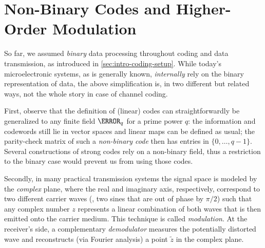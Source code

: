 \section{Non-Binary Codes and Higher-Order Modulation}\label{sec:intro-nonbinary}

So far, we assumed \emph{binary} data processing throughout coding and data transmission, as introduced in \cref{sec:intro-coding-setup}. While today's microelectronic systems, as is generally known, \emph{internally} rely on the binary representation of data, the above simplification is, in two different but related ways, not the whole story in case of channel coding.

First, observe that the definition of (linear) codes can straightforwardly be generalized to any finite field $\F_q$ for a prime power $q$: the information and codewords still lie in vector spaces and linear maps can be defined as usual; the parity-check matrix of such a \emph{non-binary code} then has entries in $\{0,\dotsc,q-1\}$. Several constructions of strong codes rely on a non-binary field, thus a restriction to the binary case would prevent us from using those codes.

Secondly, in many practical transmission systems the signal space is modeled by the \emph{complex} plane, where the real and imaginary axis, respectively, correspond to two different carrier waves (\eg, two sines that are out of phase by $π/2$) such that any complex number $z$ represents a linear combination of both waves that is then emitted onto the carrier medium. This technique is called \emph{modulation}. At the receiver's side, a complementary \emph{demodulator} measures the potentially distorted wave and reconstructs (\eg via Fourier analysis) a point $\tilde z$ in the complex plane.

